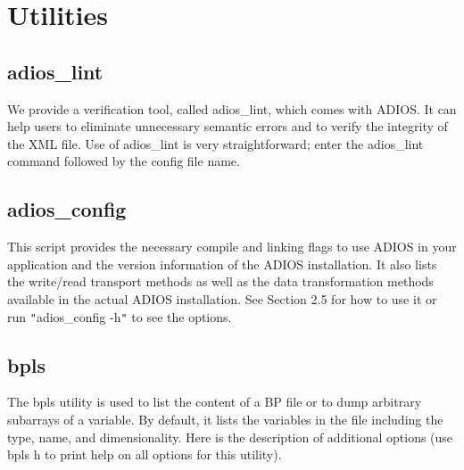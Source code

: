 \chapter{Utilities}

\section{adios\_lint}

We provide a verification tool, called adios\_lint, which comes with ADIOS. It 
can help users to eliminate unnecessary semantic errors and to verify the integrity 
of the XML file. Use of adios\_lint is very straightforward; enter the adios\_lint 
command followed by the config file name.

\section{adios\_config}

This script provides the necessary compile and linking flags to use ADIOS in your 
application and the version information of the ADIOS installation. It also 
lists the write/read transport methods as well as the data transformation methods
available in the actual ADIOS installation. See Section 
2.5 for how to use it or run \texttt{"}adios\_config -h\texttt{"} to see the options. 


\section{bpls}

The bpls utility is used to list the content of a BP file or to dump arbitrary 
subarrays of a variable. By default, it lists the variables in the file including 
the type, name, and dimensionality. Here is the description of additional options 
(use bpls \-{}h to print help on all options for this utility).


